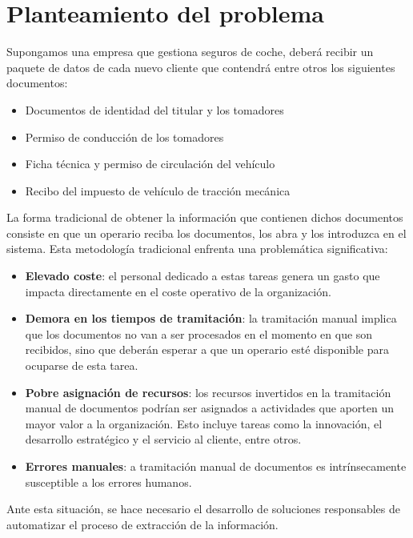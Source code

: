 \section{Planteamiento del problema}

Supongamos una empresa que gestiona seguros de coche, deberá recibir un paquete de datos de cada nuevo cliente que
contendrá entre otros los siguientes documentos:

\begin{itemize}
    \item Documentos de identidad del titular y los tomadores
    \item Permiso de conducción de los tomadores
    \item Ficha técnica y permiso de circulación del vehículo
    \item Recibo del impuesto de vehículo de tracción mecánica
\end{itemize}

La forma tradicional de obtener la información que contienen dichos documentos consiste en que un operario reciba los
documentos, los abra y los introduzca en el sistema.
Esta metodología tradicional enfrenta una problemática significativa:

\begin{itemize}
    \item \textbf{Elevado coste}:
    el personal dedicado a estas tareas genera un gasto que impacta directamente en el coste operativo de la
    organización.
    \item \textbf{Demora en los tiempos de tramitación}:
    la tramitación manual implica que los documentos no van a ser procesados en el momento en que son recibidos, sino
    que deberán esperar a que un operario esté disponible para ocuparse de esta tarea.
    \item \textbf{Pobre asignación de recursos}:
    los recursos invertidos en la tramitación manual de documentos podrían ser asignados a actividades que aporten un
    mayor valor a la organización.
    Esto incluye tareas como la innovación, el desarrollo estratégico y el servicio al cliente, entre otros.
    \item \textbf{Errores manuales}:
    a tramitación manual de documentos es intrínsecamente susceptible a los errores humanos.
\end{itemize}

Ante esta situación, se hace necesario el desarrollo de soluciones responsables de automatizar el proceso de extracción
de la información.